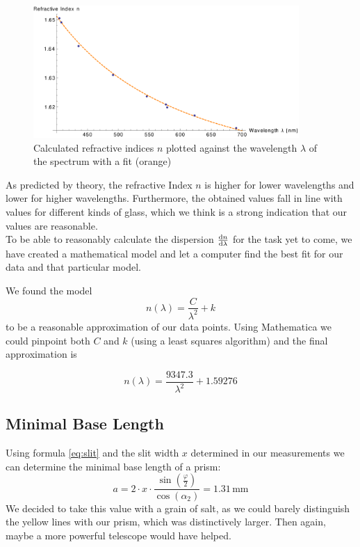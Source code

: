 \documentclass{scrreprt}
\newcommand{\unit}[1]{\ensuremath{\, \mathrm{#1}}}
\renewcommand{\phi}{\varphi}
\begin{document}
\begin{figure}[H]
	\centering
  \includegraphics[width=0.9\textwidth]{diag/meas_and_fit.pdf}
	\caption{Calculated refractive indices $n$ plotted against the wavelength $\lambda$ of the spectrum with a fit (orange)}
	\label{fig:meas_and_fit}
\end{figure}
As predicted by theory, the refractive Index $n$ is higher for lower wavelengths and lower for higher wavelengths. Furthermore, the obtained values fall in line with values for different kinds of glass, which we think is a strong indication that our values are reasonable.\\

To be able to reasonably calculate the dispersion $\frac{\dif n}{\dif \lambda}$ for the task yet to come, we have created a mathematical model and let a computer find the best fit for our data and that particular model.

We found the model 
\begin{equation}
n (\lambda) = \frac{C}{\lambda^2}+k
\end{equation}
to be a reasonable approximation of our data points. Using Mathematica we could pinpoint both $C$ and $k$ (using a least squares algorithm) and the final approximation is

\begin{equation}\label{eq:approx}
n (\lambda) = \frac{9347.3}{\lambda^2}+1.59276
\end{equation} 

\subsection{Minimal Base Length}
\label{sec:base_length}

Using formula \ref{eq:slit} and the slit width $x$ determined in our measurements we can determine the minimal base length of a prism:
\begin{equation}
	a = 2 \cdot x \cdot \frac{\sin(\frac{\phi}{2})}{\cos({\alpha_2})} = 1.31 \unit{mm}	
\end{equation}
We decided to take this value with a grain of salt, as we could barely distinguish the yellow lines with our prism, which was distinctively larger. Then again, maybe a more powerful telescope would have helped.
\end{document}
